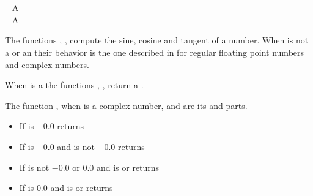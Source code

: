 \documentclass[../Exponentials-Logarithms-Trigonometry.tex]{subfiles}
\begin{document}

\DSyntax{}

  \RArrow {}\\
  \RArrow {}\\
  \RArrow {}

\DArgsNValues{}

 -- A \\
 -- A 

\DDescription{}

The functions , ,  compute the sine, cosine
and tangent of a number. When  is not a  or an
 their behavior is the one described in
\cite{1996:ANSIHyperSpec} for regular floating point numbers and complex
numbers.

\noindent
When  is a  the functions ,
,  return a .

\noindent
The function , when  is a complex number, 
and  are its  and  parts.
%
\begin{itemize}
\item If  is $-0.0$ returns 
\item If  is $-0.0$ and  is not
  $-0.0$ returns \code{))))}
\item If  is not $-0.0$ or $0.0$ and
   is  or  returns\\
   \code{)} \code{))}
\item If  is $0.0$ and  is
   or  returns \code{)}
\end{itemize}
\end{document}
